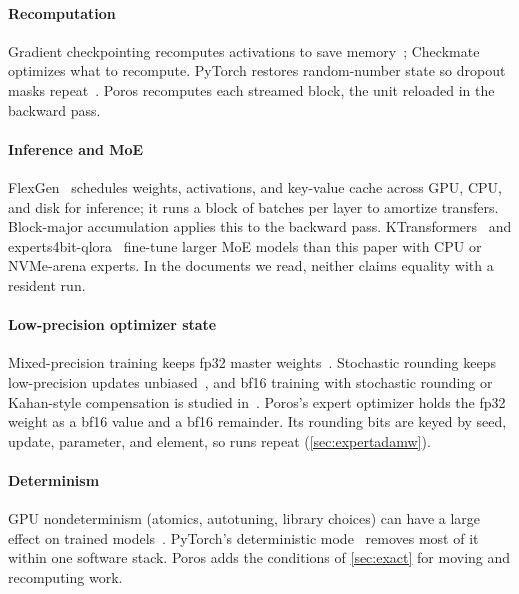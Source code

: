 \documentclass[11pt,letterpaper]{article}
\theoremstyle{definition}
\theoremstyle{plain}
\begin{document}
\paragraph{Recomputation}
Gradient checkpointing recomputes activations to save memory~\cite{griewank2000revolve,chen2016training}; Checkmate~\cite{jain2020checkmate} optimizes what to recompute. PyTorch restores random-number state so dropout masks repeat~\cite{pytorch_checkpoint}. Poros recomputes each streamed block, the unit reloaded in the backward pass.
\paragraph{Inference and MoE}
FlexGen~\cite{sheng2023flexgen} schedules weights, activations, and key-value cache across GPU, CPU, and disk for inference; it runs a block of batches per layer to amortize transfers. Block-major accumulation applies this to the backward pass. KTransformers~\cite{ktransformers} and experts4bit-qlora~\cite{experts4bit} fine-tune larger MoE models than this paper with CPU or NVMe-arena experts. In the documents we read, neither claims equality with a resident run.

\paragraph{Low-precision optimizer state}
Mixed-precision training keeps fp32 master weights~\cite{micikevicius2018mixed}.
Stochastic rounding keeps low-precision updates unbiased~\cite{gupta2015deep}, and bf16 training with stochastic rounding or Kahan-style compensation is studied in~\cite{zamirai2020revisiting}.
Poros's expert optimizer holds the fp32 weight as a bf16 value and a bf16 remainder.
Its rounding bits are keyed by seed, update, parameter, and element, so runs repeat (\cref{sec:expertadamw}).

\paragraph{Determinism}
GPU nondeterminism (atomics, autotuning, library choices) can have a large effect on trained models~\cite{zhuang2022randomness}. PyTorch's deterministic mode~\cite{pytorch_repro} removes most of it within one software stack. Poros adds the conditions of \cref{sec:exact} for moving and recomputing work.

\end{document}
